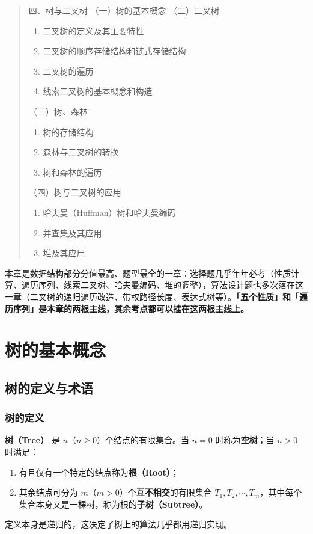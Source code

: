 \documentclass[11pt,openany,UTF8]{ctexbook}
\begin{document}
\begin{quote}
四、树与二叉树 （一）树的基本概念 （二）二叉树

\begin{enumerate}
\item 二叉树的定义及其主要特性
\item 二叉树的顺序存储结构和链式存储结构
\item 二叉树的遍历
\item 线索二叉树的基本概念和构造
\end{enumerate}
（三）树、森林

\begin{enumerate}
\item 树的存储结构
\item 森林与二叉树的转换
\item 树和森林的遍历
\end{enumerate}
（四）树与二叉树的应用

\begin{enumerate}
\item 哈夫曼（Huffman）树和哈夫曼编码
\item 并查集及其应用
\item 堆及其应用
\end{enumerate}
\end{quote}
本章是数据结构部分分值最高、题型最全的一章：选择题几乎年年必考（性质计算、遍历序列、线索二叉树、哈夫曼编码、堆的调整），算法设计题也多次落在这一章（二叉树的递归遍历改造、带权路径长度、表达式树等）。\textbf{「五个性质」和「遍历序列」是本章的两根主线，其余考点都可以挂在这两根主线上。}

\section{树的基本概念}

\subsection{树的定义与术语}

\subsubsection{树的定义}

\textbf{树（Tree）} 是 $n$（$n\ge 0$）个结点的有限集合。当 $n=0$ 时称为\textbf{空树}；当 $n>0$ 时满足：

\begin{enumerate}
\item 有且仅有一个特定的结点称为\textbf{根（Root）}；
\item 其余结点可分为 $m$（$m>0$）个\textbf{互不相交}的有限集合 $T_1,T_2,\cdots,T_m$，其中每个集合本身又是一棵树，称为根的\textbf{子树（Subtree）}。
\end{enumerate}
定义本身是递归的，这决定了树上的算法几乎都用递归实现。
\end{document}
